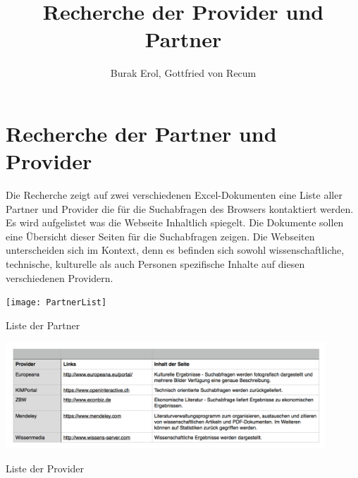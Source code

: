 
\title{Recherche der Provider und Partner}
\author{Burak Erol, Gottfried von Recum}


\chapter{Recherche der Partner und Provider}

Die Recherche zeigt auf zwei verschiedenen Excel-Dokumenten eine Liste aller Partner und Provider die für die Suchabfragen des Browsers kontaktiert werden. Es wird aufgelistet was die Webseite Inhaltlich spiegelt. Die Dokumente sollen eine Übersicht dieser Seiten für die Suchabfragen zeigen. Die Webseiten unterscheiden sich im Kontext, denn es befinden sich sowohl wissenschaftliche, technische, kulturelle als auch Personen spezifische Inhalte auf diesen verschiedenen Providern.

\begin{table}[ht]
	\centering
	\texttt{[image: PartnerList]}
	\caption{Liste der Partner}
	\label{fig:Partner}
\end{table}

\begin{table}[ht]
	\centering
	\includegraphics[width=12cm]{Pics/ProviderList}
	\caption{Liste der Provider}
	\label{fig:Provider}
\end{table}
